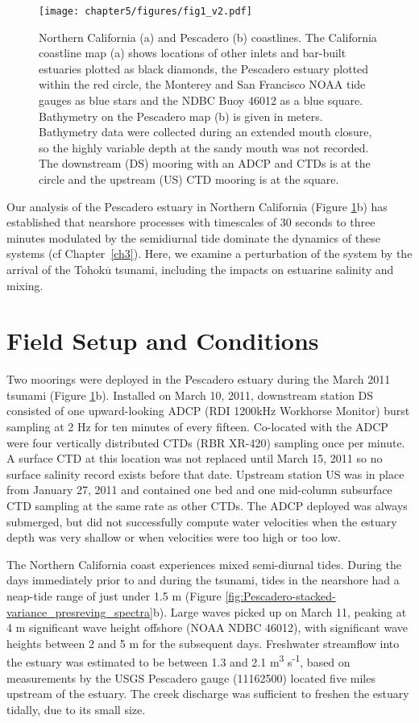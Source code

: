\begin{figure}
\centering
\texttt{[image: chapter5/figures/fig1\_v2.pdf]}\protect\caption{Northern California (a) and Pescadero (b) coastlines. The California
coastline map (a) shows locations of other inlets and bar-built estuaries
plotted as black diamonds, the Pescadero estuary plotted within the
red circle, the Monterey and San Francisco NOAA tide gauges as blue
stars and the NDBC Buoy 46012 as a blue square. Bathymetry on the
Pescadero map (b) is given in meters. Bathymetry data were collected
during an extended mouth closure, so the highly variable depth at
the sandy mouth was not recorded. The downstream (DS) mooring with
an ADCP and CTDs is at the circle and the upstream (US) CTD mooring
is at the square. \label{fig:coastline_map_with_inlets}}
\end{figure}

Our analysis of the Pescadero estuary in Northern California (Figure
\ref{fig:coastline_map_with_inlets}b) has established that nearshore
processes with timescales of 30 seconds to three minutes modulated
by the semidiurnal tide dominate the dynamics of these systems (cf Chapter~\ref{ch3}).
Here, we examine a perturbation of the system by the arrival of the
Tohok$\overline{\mathrm{u}}$ tsunami, including the impacts on estuarine salinity and mixing. 


\section{Field Setup and Conditions}

Two moorings were deployed in the Pescadero estuary during the March
2011 tsunami (Figure \ref{fig:coastline_map_with_inlets}b). Installed
on March 10, 2011, downstream station DS consisted of one upward-looking
ADCP (RDI 1200kHz Workhorse Monitor) burst sampling at 2 Hz for ten
minutes of every fifteen. Co-located with the ADCP were four vertically
distributed CTDs (RBR XR-420) sampling once per minute. A surface
CTD at this location was not replaced until March 15, 2011 so no surface
salinity record exists before that date. Upstream station US was in
place from January 27, 2011 and contained one bed and one mid-column
subsurface CTD sampling at the same rate as other CTDs. The ADCP deployed
was always submerged, but did not successfully compute water velocities
when the estuary depth was very shallow or when velocities were too
high or too low. 

The Northern California coast experiences mixed semi-diurnal tides.
During the days immediately prior to and during the tsunami, tides
in the nearshore had a neap-tide range of just under 1.5 m
(Figure \ref{fig:Pescadero-stacked-variance_presreving_spectra}b).
Large waves picked up on March 11, peaking at 4 m significant wave
height offshore (NOAA NDBC 46012), with significant wave heights between
2 and 5 m for the subsequent days. Freshwater streamflow into
the estuary was estimated to be between 1.3 and 2.1 m\textsuperscript{3}
s\textsuperscript{-1}, based on measurements by the USGS Pescadero
gauge (11162500) located five miles upstream of the estuary. The creek discharge was sufficient to freshen the estuary tidally,
due to its small size. 

